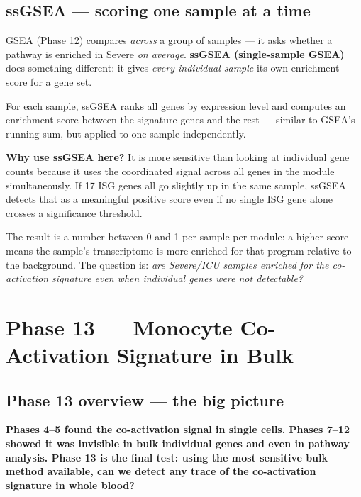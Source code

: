 \documentclass[11pt, a4paper]{article}
\begin{document}
\subsection{ssGSEA — scoring one sample at a time}

GSEA (Phase 12) compares \textit{across} a group of samples — it asks
whether a pathway is enriched in Severe \textit{on average}.
\textbf{ssGSEA (single-sample GSEA)} does something different: it gives
\textit{every individual sample} its own enrichment score for a gene set.

For each sample, ssGSEA ranks all genes by expression level and computes
an enrichment score between the signature genes and the rest — similar to
GSEA's running sum, but applied to one sample independently.

\textbf{Why use ssGSEA here?}
It is more sensitive than looking at individual gene counts because it
uses the coordinated signal across all genes in the module simultaneously.
If 17 ISG genes all go slightly up in the same sample, ssGSEA detects
that as a meaningful positive score even if no single ISG gene alone
crosses a significance threshold.

The result is a number between 0 and 1 per sample per module:
a higher score means the sample's transcriptome is more enriched for
that program relative to the background. The question is:
\textit{are Severe/ICU samples enriched for the co-activation signature
even when individual genes were not detectable?}

\section{Phase 13 — Monocyte Co-Activation Signature in Bulk}

\subsection{Phase 13 overview — the big picture}

\textbf{Phases 4--5 found the co-activation signal in single cells.
Phases 7--12 showed it was invisible in bulk individual genes and even in pathway analysis.
Phase 13 is the final test: using the most sensitive bulk method available,
can we detect any trace of the co-activation signature in whole blood?}
\end{document}
